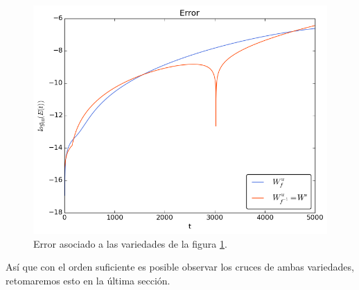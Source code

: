 \begin{figure}[H]
\centering
\includegraphics[scale=0.6]{ErrorHenon3}
\caption{Error asociado a las variedades de la figura \ref{Henon3}.}
\label{Henon3}
\end{figure}


Así que con el orden suficiente es posible observar los cruces de ambas variedades, retomaremos esto en la última sección. 

